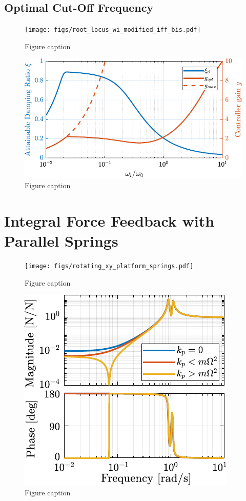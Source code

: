 \documentclass{ISMA_USD2020}
\begin{document}
\subsection{Optimal Cut-Off Frequency}
\label{sec:orge829a45}

\begin{figure}[htbp]
\centering
\texttt{[image: figs/root\_locus\_wi\_modified\_iff\_bis.pdf]}
\caption{\label{fig:root_locus_wi_modified_iff}Figure caption}
\end{figure}


\begin{figure}[htbp]
\centering
\includegraphics[scale=1]{figs/mod_iff_damping_wi.pdf}
\caption{\label{fig:mod_iff_damping_wi}Figure caption}
\end{figure}

\section{Integral Force Feedback with Parallel Springs}
\label{sec:orgd96ea25}

\begin{figure}[htbp]
\centering
\texttt{[image: figs/rotating\_xy\_platform\_springs.pdf]}
\caption{\label{fig:rotating_xy_platform_springs}Figure caption}
\end{figure}

\begin{figure}[htbp]
\centering
\includegraphics[scale=1]{figs/plant_iff_kp.pdf}
\caption{\label{fig:plant_iff_kp}Figure caption}
\end{figure}
\end{document}
